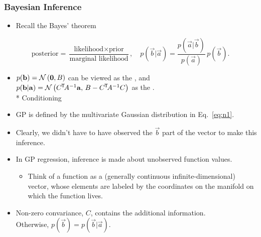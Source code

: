 \begin{frame} \frametitle{Bayesian Inference}
\vspace{-2mm}
\begin{itemize}
  \item Recall the Bayes' theorem
\end{itemize}
\vspace{1mm}
\begin{equation}
  \text{posterior} =
  \frac{\text{likelihood}\times\text{prior}}{\text{marginal likelihood}},
  \quad
  p(\vec{b}|\vec{a}) = \frac{p(\vec{a}|\vec{b})}{p(\vec{a})}\,p(\vec{b}).
\end{equation}
\begin{itemize}
  \item $p(\mathbf{b}) = \mathcal{N}\left(\mathbf{0},B\right)$ can be viewed as the ,
    and $p(\mathbf{b}|\mathbf{a}) = \mathcal{N}\left(C^{\mkern-1.5mu\mathsf{T}}\!A^{-1}\mathbf{a},\,B-C^{\mkern-1.5mu\mathsf{T}}\!A^{-1}C\right)$ as the
    . \\
    {\small\color{gray} * Conditioning}
  \vspace{1mm}
  \item GP is defined by the multivariate Gaussian distribution in
    Eq.~\ref{eq:n1}.
  \vspace{1mm}
  \item Clearly, we didn't have to have observed the $\vec{b}$ part of the
    vector to make this inference.
  \vspace{1mm}
  \item In GP regression, inference is made about unobserved function values.
  \begin{itemize}
    \item Think of a function as a (generally continuous infinite-dimensional)
      vector, whose elements are labeled by the coordinates on the manifold
      on which the function lives.
  \end{itemize}
  \vspace{1mm}
  \item Non-zero convariance, $C$, contains the additional information. \\
    Otherwise, $p(\vec{b}) = p(\vec{b}|\vec{a})$.
\end{itemize}
\end{frame}

